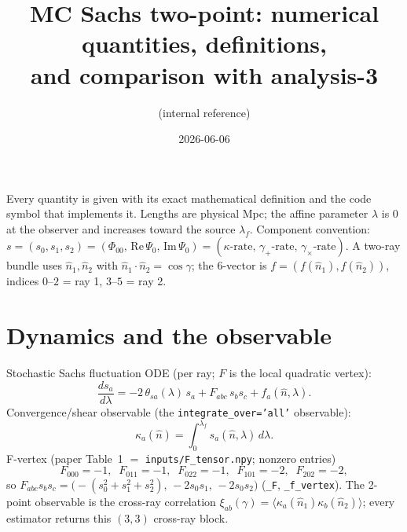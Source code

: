 \documentclass[11pt]{article}
\title{\vspace{-2.5em}MC Sachs two-point: numerical quantities, definitions,\\
and comparison with analysis-3}
\author{\code{analyses/mc\_sachs\_2pt/} \quad (internal reference)}
\date{2026-06-06}
\newcommand{\code}[1]{\texttt{#1}}
\newcommand{\lam}{\lambda}
\newcommand{\lamf}{\lambda_f}
\newcommand{\nh}{\hat{n}}
\begin{document}
\sloppy
\maketitle
\vspace{-1.5em}

Every quantity is given with its exact mathematical definition and the code symbol
that implements it. Lengths are physical Mpc; the affine parameter $\lam$ is $0$ at
the observer and increases toward the source $\lamf$. Component convention:
$s=(s_0,s_1,s_2)=(\Phi_{00},\,\mathrm{Re}\,\Psi_0,\,\mathrm{Im}\,\Psi_0)
=(\kappa\text{-rate},\,\gamma_+\text{-rate},\,\gamma_\times\text{-rate})$. A two-ray
bundle uses $\nh_1,\nh_2$ with $\nh_1\!\cdot\!\nh_2=\cos\gamma$; the 6-vector is
$f=(f(\nh_1),f(\nh_2))$, indices $0$--$2$ = ray 1, $3$--$5$ = ray 2.

\section{Dynamics and the observable}
Stochastic Sachs fluctuation ODE (per ray; $F$ is the local quadratic vertex):
\begin{equation}
\frac{d s_a}{d\lam} = -2\,\theta_{sa}(\lam)\,s_a + F_{abc}\,s_b s_c + f_a(\nh,\lam).
\label{eq:sachs}
\end{equation}
Convergence/shear observable (the \code{integrate\_over='all'} observable):
\begin{equation}
\kappa_a(\nh) = \int_0^{\lamf} s_a(\nh,\lam)\,d\lam .
\label{eq:kappa}
\end{equation}
F-vertex (paper Table~1 $=$ \code{inputs/F\_tensor.npy}; nonzero entries)
\begin{equation}
F_{000}=-1,\;\; F_{011}=-1,\;\; F_{022}=-1,\;\; F_{101}=-2,\;\; F_{202}=-2,
\label{eq:Fvertex}
\end{equation}
so $F_{abc}s_b s_c=\bigl(-(s_0^2+s_1^2+s_2^2),\,-2s_0 s_1,\,-2s_0 s_2\bigr)$
(\code{\_F}, \code{\_f\_vertex}). The 2-point observable is the cross-ray
correlation $\xi_{ab}(\gamma)=\langle\kappa_a(\nh_1)\kappa_b(\nh_2)\rangle$; every
estimator returns this $(3,3)$ cross-ray block.
\end{document}
